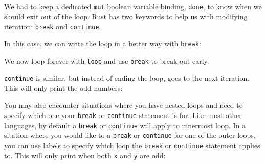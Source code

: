 \documentclass[a4paper,]{book}
\newenvironment{Shaded}{\begin{snugshade}}{\end{snugshade}}
\newcommand{\KeywordTok}[1]{\textcolor[rgb]{0.13,0.29,0.53}{\textbf{{#1}}}}
\newcommand{\DecValTok}[1]{\textcolor[rgb]{0.00,0.00,0.81}{{#1}}}
\newcommand{\StringTok}[1]{\textcolor[rgb]{0.31,0.60,0.02}{{#1}}}
\newcommand{\PreprocessorTok}[1]{\textcolor[rgb]{0.56,0.35,0.01}{\textit{{#1}}}}
\newcommand{\NormalTok}[1]{{#1}}
\begin{document}
We had to keep a dedicated \texttt{mut} boolean variable binding,
\texttt{done}, to know when we should exit out of the loop. Rust has two
keywords to help us with modifying iteration: \texttt{break} and
\texttt{continue}.

In this case, we can write the loop in a better way with \texttt{break}:

\begin{Shaded}
\end{Shaded}

We now loop forever with \texttt{loop} and use \texttt{break} to break
out early.

\texttt{continue} is similar, but instead of ending the loop, goes to
the next iteration. This will only print the odd numbers:

\begin{Shaded}
\end{Shaded}

You may also encounter situations where you have nested loops and need
to specify which one your \texttt{break} or \texttt{continue} statement
is for. Like most other languages, by default a \texttt{break} or
\texttt{continue} will apply to innermost loop. In a sitation where you
would like to a \texttt{break} or \texttt{continue} for one of the outer
loops, you can use labels to specify which loop the \texttt{break} or
\texttt{continue} statement applies to. This will only print when both
\texttt{x} and \texttt{y} are odd:
\end{document}
